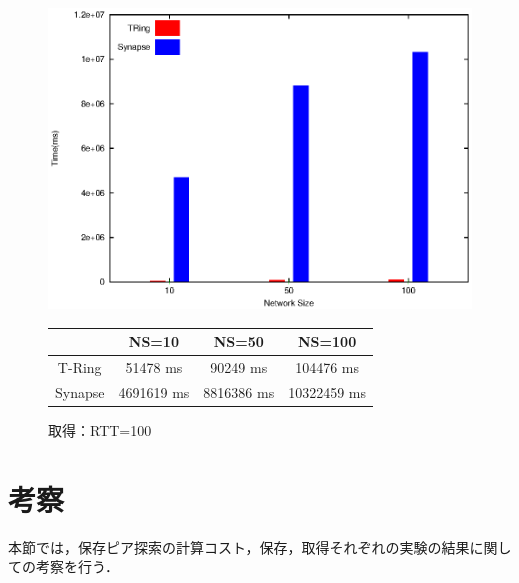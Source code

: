 \begin{figure}[htbp]
\begin{minipage}{1\textwidth}
    \centering
\includegraphics[width=14cm]{./images/compare_retrieve_rtt100.eps}
\begin{center}
  \begin{tabular}{|c||c|c|c|} \hline
  \backslashbox{}{} & NS=10 & NS=50 & NS=100  \\ \hline \hline
       T-Ring & 51478 ms & 90249 ms & 104476 ms  \\ \hline
       Synapse & 4691619  ms & 8816386 ms & 10322459 ms \\ \hline
  \end{tabular}
\end{center}
\caption{取得：RTT=100}
 \label{fig:compare_retrieve_rtt100}
 \end{minipage}
\end{figure}

\section{考察}
本節では，保存ピア探索の計算コスト，保存，取得それぞれの実験の結果に関しての考察を行う．
